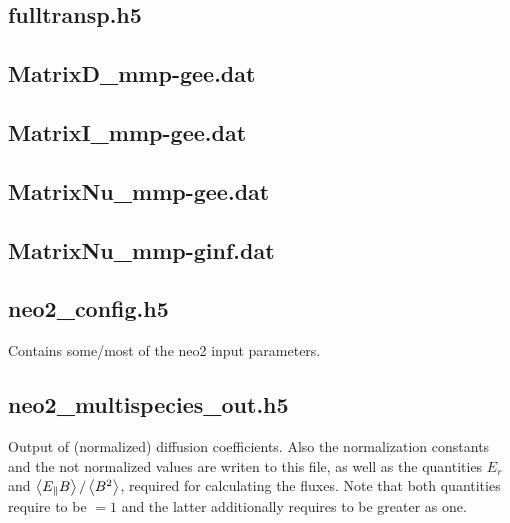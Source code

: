 \subsection{fulltransp.h5}

\subsection{MatrixD\_mmp-gee.dat}

\subsection{MatrixI\_mmp-gee.dat}

\subsection{MatrixNu\_mmp-gee.dat}

\subsection{MatrixNu\_mmp-ginf.dat}

\subsection{neo2\_config.h5}
Contains some/most of the neo2 input parameters.

\subsection{neo2\_multispecies\_out.h5}
Output of (normalized) diffusion coefficients. Also the normalization
constants and the not normalized values are writen to this file, as well
as the quantities $E_r$ and $\left\langle E_{\parallel} B\right\rangle/\left\langle B^2\right\rangle$,
required for calculating the fluxes.
Note that both quantities require  to be
$=1$ and the latter additionally requires  to be
greater as one.

